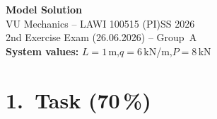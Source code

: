 \documentclass[a4paper,11pt]{article}
\begin{document}

\begin{center}
  {\Large\bfseries Model Solution}\\[4pt]
  {\large VU Mechanics -- LAWI 100515 (PI)\quad SS 2026}\\[2pt]
  {\normalsize 2nd Exercise Exam (26.06.2026) -- Group~A}\\[2pt]
  {\normalsize \textbf{System values:} $L = 1$\,m,\quad $q = 6$\,kN/m,\quad $P = 8$\,kN}
\end{center}

\section*{1.~Task \hfill (70\,\%)}
\end{document}
